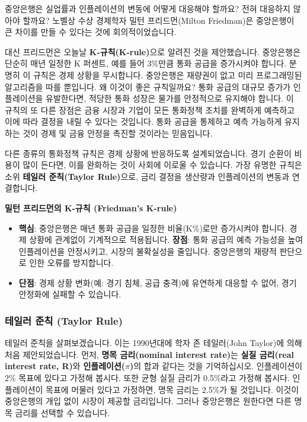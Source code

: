 \documentclass[11pt,a4paper]{book}
\theoremstyle{definition}
\begin{document}
중앙은행은 실업률과 인플레이션의 변동에 어떻게 대응해야 할까요? 전혀 대응하지 않아야 할까요? 노벨상 수상 경제학자 밀턴 프리드먼(Milton Friedman)은 중앙은행이 큰 차이를 만들 수 있다는 것에 회의적이었습니다.

대신 프리드먼은 오늘날 \textbf{K-규칙(K-rule)}으로 알려진 것을 제안했습니다. 중앙은행은 단순히 매년 일정한 K 퍼센트, 예를 들어 3\%만큼 통화 공급을 증가시켜야 합니다. 분명히 이 규칙은 경제 상황을 무시합니다. 중앙은행은 재량권이 없고 미리 프로그래밍된 알고리즘을 따를 뿐입니다. 왜 이것이 좋은 규칙일까요? 통화 공급의 대규모 증가가 인플레이션을 유발한다면, 적당한 통화 성장은 물가를 안정적으로 유지해야 합니다. 이 규칙의 또 다른 장점은 금융 시장과 기업이 모든 통화정책 조치를 완벽하게 예측하고 이에 따라 결정을 내릴 수 있다는 것입니다. 통화 공급을 통제하고 예측 가능하게 유지하는 것이 경제 및 금융 안정을 촉진할 것이라는 믿음입니다.

다른 종류의 통화정책 규칙은 경제 상황에 반응하도록 설계되었습니다. 경기 순환이 비용이 많이 든다면, 이를 완화하는 것이 사회에 이로울 수 있습니다. 가장 유명한 규칙은 소위 \textbf{테일러 준칙(Taylor Rule)}으로, 금리 결정을 생산량과 인플레이션의 변동과 연결합니다.

\begin{conceptbox}
\textbf{밀턴 프리드먼의 K-규칙 (Friedman's K-rule)}
\begin{itemize}
    \item \textbf{핵심}: 중앙은행은 매년 통화 공급을 일정한 비율(K\%)로만 증가시켜야 합니다. 경제 상황에 관계없이 기계적으로 적용됩니다.
    \textbf{장점}: 통화 공급의 예측 가능성을 높여 인플레이션을 안정시키고, 시장의 불확실성을 줄입니다. 중앙은행의 재량적 판단으로 인한 오류를 방지합니다.
    \item \textbf{단점}: 경제 상황 변화(예: 경기 침체, 공급 충격)에 유연하게 대응할 수 없어, 경기 안정화에 실패할 수 있습니다.
\end{itemize}
\end{conceptbox}

\subsubsection*{테일러 준칙 (Taylor Rule)}

테일러 준칙을 살펴보겠습니다. 이는 1990년대에 학자 존 테일러(John Taylor)에 의해 처음 제안되었습니다. 먼저, \textbf{명목 금리(nominal interest rate)}는 \textbf{실질 금리(real interest rate, R)}와 \textbf{인플레이션($\pi$)}의 합과 같다는 것을 기억하십시오. 인플레이션이 2\% 목표에 있다고 가정해 봅시다. 또한 균형 실질 금리가 0.5\%라고 가정해 봅시다. 인플레이션이 목표에 머물러 있다고 가정하면, 명목 금리는 2.5\%가 될 것입니다. 이것이 중앙은행의 개입 없이 시장이 제공할 금리입니다. 그러나 중앙은행은 원한다면 다른 명목 금리를 선택할 수 있습니다.
\end{document}
